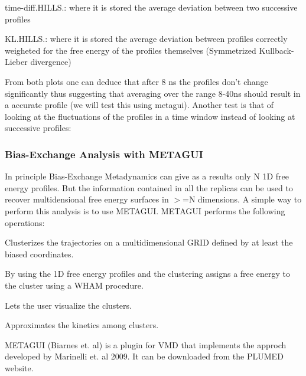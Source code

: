 \begin{DoxyEnumerate}
\item time-\/diff.\+H\+I\+L\+L\+S.\+: where it is stored the average deviation between two successive profiles
\item K\+L.\+H\+I\+L\+L\+S.\+: where it is stored the average deviation between profiles correctly weigheted for the free energy of the profiles themselves (Symmetrized Kullback-\/\+Lieber divergence)
\end{DoxyEnumerate}

From both plots one can deduce that after 8 ns the profiles don't change significantly thus suggesting that averaging over the range 8-\/40ns should result in a accurate profile (we will test this using metagui). Another test is that of looking at the fluctuations of the profiles in a time window instead of looking at successive profiles\+:

\label{belfast-8_belfast-8-convergence-fig}%
\hypertarget{belfast-8_belfast-8-convergence-fig}{}%
\hypertarget{belfast-8_metagui}{}\subsubsection{Bias-\/\+Exchange Analysis with M\+E\+T\+A\+G\+U\+I}\label{belfast-8_metagui}
In principle Bias-\/\+Exchange Metadynamics can give as a results only N 1\+D free energy profiles. But the information contained in all the replicas can be used to recover multidensional free energy surfaces in $>$=N dimensions. A simple way to perform this analysis is to use M\+E\+T\+A\+G\+U\+I. M\+E\+T\+A\+G\+U\+I performs the following operations\+:


\begin{DoxyEnumerate}
\item Clusterizes the trajectories on a multidimensional G\+R\+I\+D defined by at least the biased coordinates.
\item By using the 1\+D free energy profiles and the clustering assigns a free energy to the cluster using a W\+H\+A\+M procedure.
\item Lets the user visualize the clusters.
\item Approximates the kinetics among clusters.
\end{DoxyEnumerate}

M\+E\+T\+A\+G\+U\+I (Biarnes et. al) is a plugin for V\+M\+D that implements the approch developed by Marinelli et. al 2009. It can be downloaded from the P\+L\+U\+M\+E\+D website.

